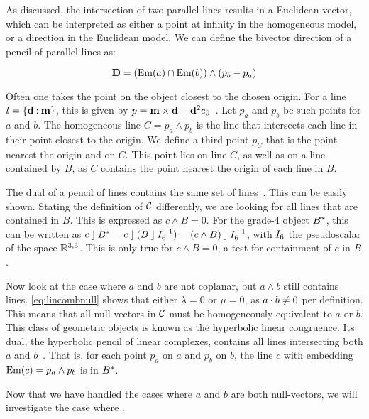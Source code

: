 As discussed, the intersection of two parallel lines results in a Euclidean vector, which can be interpreted as either a point at infinity in the homogeneous model, or a direction in the Euclidean model.  We can define the bivector direction of a pencil of parallel lines as:

\begin{equation*}
  \mathbf{D} = \left(\operatorname{Em}(a) \cap \operatorname{Em}(b)\right) \wedge \left(p_b - p_a\right)
\end{equation*}

Often one takes the point on the object closest to the chosen origin.  For a line $l = \{\mathbf{d} \mathbin{:} \mathbf{m}\}$, this is given by $p = \mathbf{m} \times \mathbf{d} + \mathbf{d}^2 e_0$~\cite{Shoemake}.  Let $p_a$ and $p_b$ be such points for $a$ and $b$.  The homogeneous line $C = p_a \wedge p_b$ is the line that intersects each line in their point closest to the origin.  We define a third point $p_C$ that is the point nearest the origin and on $C$.  This point lies on line $C$, as well as on a line contained by $B$, as $C$ contains the point nearest the origin of each line in $B$.

The dual of a pencil of lines contains the same set of lines~\cite[Section 3.2.1]{Pottmann}.  This can be easily shown.  Stating the definition of $\mathcal{C}$ differently, we are looking for all lines that are contained in $B$.  This is expressed as $c \wedge B = 0$.  For the grade-4 object $B^\ast$, this can be written as $c \mathbin{\rfloor} B^\ast = c \mathbin{\rfloor} (B \mathbin{\rfloor} I_6^{-1}) = (c \wedge B) \mathbin{\rfloor} I_6^{-1}$, with $I_6$ the pseudoscalar of the space $\mathbb{R}^{3,3}$.  This is only true for $c \wedge B = 0$, a test for containment of $c$ in $B$.

Now look at the case where $a$ and $b$ are not coplanar, but $a \wedge b$ still contains lines.  \autoref{eq:lincombnull} shows that either $\lambda = 0$ or $\mu = 0$, as $a \mathbin{\cdot} b \not= 0$ per definition.  This means that all null vectors in $\mathcal{C}$ must be homogeneously equivalent to $a$ or $b$.  This class of geometric objects is known as the hyperbolic linear congruence.  Its dual, the hyperbolic pencil of linear complexes, contains all lines intersecting both $a$ and $b$~\cite[Proposition 3.2.3]{Pottmann}. That is, for each point $p_a$ on $a$ and $p_b$ on $b$, the line $c$ with embedding $\operatorname{Em}(c) = p_a \wedge p_b$ is in $B^\ast$.  

Now that we have handled the cases where $a$ and $b$ are both null-vectors, we will investigate the case where .

